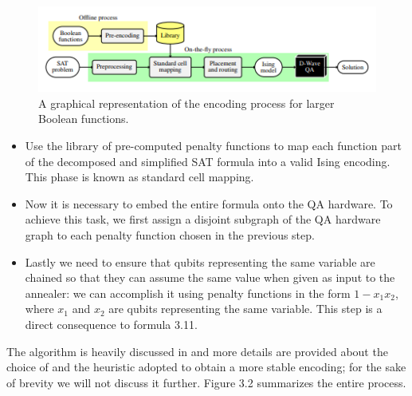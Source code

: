 \begin{figure}[t]
	\begin{center}
	\includegraphics[width=\textwidth]{images/LargeBool.PNG}
	\caption{A graphical representation of the encoding process for larger Boolean functions.}
	\end{center}
\end{figure}

\begin{itemize}
    \item Use the library of pre-computed penalty functions to map each function part of the decomposed and simplified SAT formula into a valid Ising encoding. This phase is known as standard cell mapping.
    \item Now it is necessary to embed the entire formula onto the QA hardware. To achieve this task, we first assign a disjoint subgraph of the QA hardware graph to each penalty function chosen in the previous step.
    \item Lastly we need to ensure that qubits representing the same variable are chained so that they can assume the same value when given as input to the annealer: we can accomplish it using penalty functions in the form $1 - x_1x_2$, where $x_1$ and $x_2$ are qubits representing the same variable. This step is a direct consequence to formula 3.11.
\end{itemize}

The algorithm is heavily discussed in \cite{varotti} and more details are provided about the choice of and the heuristic adopted to obtain a more stable encoding; for the sake of brevity we will not discuss it further. Figure 3.2 summarizes the entire process.

\newpage